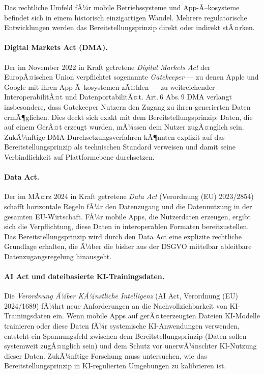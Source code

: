 ﻿\documentclass[12pt, a4paper]{article}
\begin{document}
Das rechtliche Umfeld fÃ¼r mobile Betriebssysteme und App-Ã–ko\-sys\-te\-me befindet sich
in einem historisch einzigartigen Wandel. Mehrere regulatorische Entwicklungen werden
das Bereitstellungsprinzip direkt oder indirekt stÃ¤rken.

\paragraph{Digital Markets Act (DMA).}
Der im November 2022 in Kraft getretene \emph{Digital Markets Act} der EuropÃ¤ischen Union
verpflichtet sogenannte \emph{Gatekeeper} --- zu denen Apple und Google mit ihren
App-Ã–kosystemen zÃ¤hlen --- zu weitreichender InteroperabilitÃ¤t und DatenportabilitÃ¤t.
Art.\,6 Abs.\,9 DMA verlangt insbesondere, dass Gatekeeper Nutzern den Zugang zu ihren
generierten Daten ermÃ¶glichen. Dies deckt sich exakt mit dem Bereitstellungsprinzip:
Daten, die auf einem GerÃ¤t erzeugt wurden, mÃ¼ssen dem Nutzer zugÃ¤nglich sein. ZukÃ¼nftige
DMA-Durchsetzungsverfahren kÃ¶nnten explizit auf das Bereitstellungsprinzip als technischen
Standard verweisen und damit seine Verbindlichkeit auf Plattformebene durchsetzen.

\paragraph{Data Act.}
Der im MÃ¤rz 2024 in Kraft getretene \emph{Data Act} (Verordnung (EU) 2023/2854) schafft
horizontale Regeln fÃ¼r den Datenzugang und die Datennutzung in der gesamten EU-Wirtschaft.
FÃ¼r mobile Apps, die Nutzerdaten erzeugen, ergibt sich die Verpflichtung, diese Daten in
interoperablen Formaten bereitzustellen. Das Bereitstellungsprinzip wird durch den Data Act
eine explizite rechtliche Grundlage erhalten, die Ã¼ber die bisher aus der DSGVO mittelbar
ableitbare Datenzugangsregelung hinausgeht.

\paragraph{AI Act und dateibasierte KI-Trainingsdaten.}
Die \emph{Verordnung Ã¼ber KÃ¼nstliche Intelligenz} (AI Act, Verordnung (EU) 2024/1689)
fÃ¼hrt neue Anforderungen an die Nachvollziehbarkeit von KI-Trainingsdaten ein. Wenn
mobile Apps auf gerÃ¤teerzeugten Dateien KI-Modelle trainieren oder diese Daten fÃ¼r
systemische KI-Anwendungen verwenden, entsteht ein Spannungsfeld zwischen dem
Bereitstellungsprinzip (Daten sollen systemweit zugÃ¤nglich sein) und dem Schutz vor
unerwÃ¼nschter KI-Nutzung dieser Daten. ZukÃ¼nftige Forschung muss untersuchen, wie das
Bereitstellungsprinzip in KI-regulierten Umgebungen zu kalibrieren ist.
\end{document}
